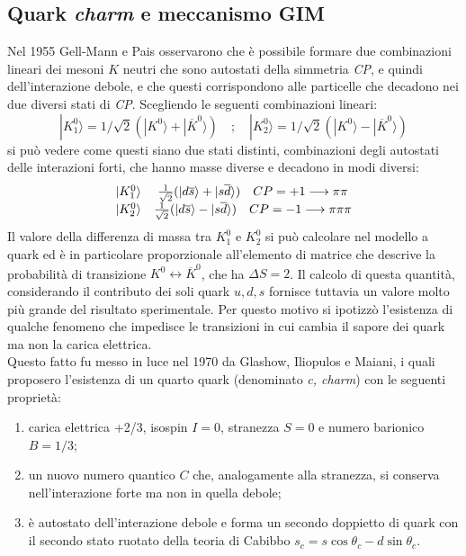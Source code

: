 \documentclass{subnucbo}
\begin{document}
\subsection{Quark \textit{charm} e meccanismo GIM}
\label{subsec:gim}
Nel 1955 Gell-Mann e Pais osservarono che è possibile formare due combinazioni lineari dei mesoni $K$ neutri che sono autostati della simmetria \textit{CP}, e quindi dell'interazione debole, e che questi corrispondono alle particelle che decadono nei due diversi stati di \textit{CP}. Scegliendo le seguenti combinazioni lineari:
\begin{equation}
        | K _ { 1 } ^ { 0 } \rangle = 1 / \sqrt { 2 } ( | K ^ { 0 } \rangle + | \overline { K } ^ { 0 } \rangle ) \quad ; \quad | K _ { 2 } ^ { 0 } \rangle = 1 / \sqrt { 2 } ( | K ^ { 0 } \rangle - | \overline { K } ^ { 0 } \rangle )
\end{equation}
si può vedere come questi siano due stati distinti, combinazioni degli autostati delle interazioni forti, che hanno masse diverse e decadono in modi diversi:
\begin{equation}
        \begin{array} { c c } { | K _ { 1 } ^ { 0 } \rangle } & { \frac { 1 } { \sqrt { 2 } } ( | d \overline { s } \rangle + | s \overline { d } \rangle ) \quad C P = + 1 \longrightarrow \pi \pi } \\ { | K _ { 2 } ^ { 0 } \rangle } & { \frac { 1 } { \sqrt { 2 } } ( | d \overline { s } \rangle - | s \overline { d } \rangle ) \quad C P = - 1 \longrightarrow \pi \pi \pi } \end{array}
\end{equation}
Il valore della differenza di massa tra $K^{0}_{1}$ e $K^{0}_{2}$ si può calcolare nel modello a quark ed è in particolare proporzionale all'elemento di matrice che descrive la probabilità di transizione $K ^ { 0 } \leftrightarrow \overline { K } ^ { 0 }$, che ha $\Delta S = 2$. Il calcolo di questa quantità, considerando il contributo dei soli quark $u, d, s$ fornisce tuttavia un valore molto più grande del risultato sperimentale. Per questo motivo si ipotizzò l'esistenza di qualche fenomeno che impedisce le transizioni in cui cambia il sapore dei quark ma non la carica elettrica. \\
Questo fatto fu messo in luce nel 1970 da Glashow, Iliopulos e Maiani, i quali proposero l'esistenza di un quarto quark (denominato \textit{c, charm}) con le seguenti proprietà:
\begin{enumerate}
        \item carica elettrica +2/3, isospin $I=0$, stranezza $S=0$ e numero barionico $B=1/3$;
        \item un nuovo numero quantico $C$ che, analogamente alla stranezza, si conserva nell'interazione forte ma non in quella debole;
        \item è autostato dell'interazione debole e forma un secondo doppietto di quark con il secondo stato ruotato della teoria di Cabibbo $s_{ c } = s \operatorname { c o s } \theta _ { c } - d \operatorname { s i n } \theta _ { c }$.
\end{enumerate}
\end{document}
